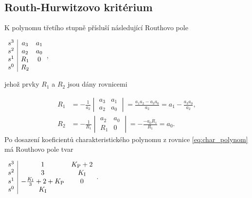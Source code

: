 \documentclass[twoside]{article}
\begin{document}
\subsection{Routh-Hurwitzovo kritérium}
K polynomu třetího stupně přísluší následující Routhovo pole

\begin{centering}
	$\begin{array}{c|cc}
		\centering
		s^3 & a_3 & a_1 \\
		s^2 & a_2 & a_0 \\
		s^1 & R_1  & 0 \\
		s^0 & R_2  &  \\
	\end{array}$, \\ 
\end{centering}

jehož prvky $R_1$ a $R_2$ jsou dány rovnicemi

\begin{equation}
	\begin{split}
		R_1 &= -\frac{1}{a_2} \begin{vmatrix*}
			a_3 & a_1 \\
			a_2 & a_0
		\end{vmatrix*} = \frac{a_1 a_2- a_3 a_0}{a_2} = a_1 -\frac{a_3 a_0}{a_2},\\
		R_2 &= - \frac{1}{R_1} \begin{vmatrix*}
			a_2 & a_0 \\
			R_1 & 0
		\end{vmatrix*} = -\frac{-a_0 R_1}{R_1} = a_0.
	\end{split}
\end{equation}
\newpage
Po dosazení koeficientů charakteristického polynomu z rovnice \eqref{eq:char_polynom} má Routhovo pole tvar 

\begin{centering}
	$\begin{array}{c|cc}
		\centering
		s^3 & 1 & K_\text{P} + 2 \\
		s^2 & 3 & K_\text{I} \\
		s^1 & -\frac{K_\text{I}}{3} + 2 + K_\text{P} & 0 \\
		s^0 & K_\text{I} &  \\
	\end{array}$. \\
\end{centering}
\end{document}
